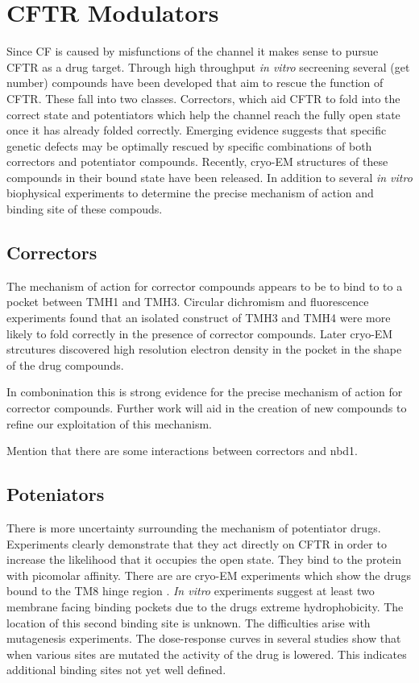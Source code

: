 \section{CFTR Modulators}
Since CF is caused by misfunctions of the channel it makes sense to pursue CFTR as a drug target. Through high throughput \textit{in vitro} secreening several (get number) compounds have been developed that aim to rescue the function of CFTR. These fall into two classes. Correctors, which aid CFTR to fold into the correct state and potentiators which help the channel reach the fully open state once it has already folded correctly. Emerging evidence suggests that specific genetic defects may be optimally rescued by specific combinations of both correctors and potentiator compounds. Recently, cryo-EM structures of these compounds in their bound state have been released. In addition to several \textit {in vitro} biophysical experiments to determine the precise mechanism of action and binding site of these compouds.

\subsection{Correctors}
The mechanism of action for corrector compounds appears to be to bind to to a pocket between TMH1 and TMH3. Circular dichromism and fluorescence experiments found that an isolated construct of TMH3 and TMH4 were more likely to fold correctly in the presence of corrector compounds. Later cryo-EM strcutures discovered high resolution electron density in the pocket in the shape of the drug compounds. 

In combonination this is strong evidence for the precise mechanism of action for corrector compounds. Further work will aid in the creation of new compounds to refine our exploitation of this mechanism.

Mention that there are some interactions between correctors and nbd1.

\subsection{Poteniators}
There is more uncertainty surrounding the mechanism of potentiator drugs. Experiments clearly demonstrate that they act directly on CFTR in order to increase the likelihood that it occupies the open state. They bind to the protein with picomolar affinity. There are are cryo-EM experiments which show the drugs bound to the TM8 hinge region \cite{}. \textit {In vitro} experiments suggest at least two membrane facing binding pockets due to the drugs extreme hydrophobicity\cite{}. The location of this second binding site is unknown. The difficulties arise with mutagenesis experiments. The dose-response curves in several studies show that when various sites are mutated the activity of the drug is lowered. This indicates additional binding sites not yet well defined. 

